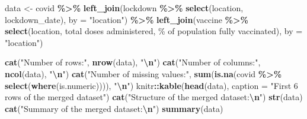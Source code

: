 \documentclass[
]{article}
\newenvironment{Shaded}{\begin{snugshade}}{\end{snugshade}}
\newcommand{\AttributeTok}[1]{\textcolor[rgb]{0.13,0.29,0.53}{#1}}
\newcommand{\FunctionTok}[1]{\textcolor[rgb]{0.13,0.29,0.53}{\textbf{#1}}}
\newcommand{\NormalTok}[1]{#1}
\newcommand{\OtherTok}[1]{\textcolor[rgb]{0.56,0.35,0.01}{#1}}
\newcommand{\SpecialCharTok}[1]{\textcolor[rgb]{0.81,0.36,0.00}{\textbf{#1}}}
\newcommand{\StringTok}[1]{\textcolor[rgb]{0.31,0.60,0.02}{#1}}
\begin{document}
\begin{Shaded}
\begin{Highlighting}[]
\NormalTok{data }\OtherTok{\textless{}{-}}\NormalTok{ covid }\SpecialCharTok{\%\textgreater{}\%}
  \FunctionTok{left\_join}\NormalTok{(lockdown }\SpecialCharTok{\%\textgreater{}\%} \FunctionTok{select}\NormalTok{(location, lockdown\_date), }\AttributeTok{by =} \StringTok{"location"}\NormalTok{) }\SpecialCharTok{\%\textgreater{}\%}
  \FunctionTok{left\_join}\NormalTok{(vaccine }\SpecialCharTok{\%\textgreater{}\%} \FunctionTok{select}\NormalTok{(location, }\StringTok{\textasciigrave{}}\AttributeTok{total doses administered}\StringTok{\textasciigrave{}}\NormalTok{, }\StringTok{\textasciigrave{}}\AttributeTok{\% of population fully vaccinated}\StringTok{\textasciigrave{}}\NormalTok{), }\AttributeTok{by =} \StringTok{"location"}\NormalTok{)}
\end{Highlighting}
\end{Shaded}

\vspace{1cm}

\begin{Shaded}
\begin{Highlighting}[]
\FunctionTok{cat}\NormalTok{(}\StringTok{"Number of rows:"}\NormalTok{, }\FunctionTok{nrow}\NormalTok{(data), }\StringTok{"}\SpecialCharTok{\textbackslash{}n}\StringTok{"}\NormalTok{)}
\FunctionTok{cat}\NormalTok{(}\StringTok{"Number of columns:"}\NormalTok{, }\FunctionTok{ncol}\NormalTok{(data), }\StringTok{"}\SpecialCharTok{\textbackslash{}n}\StringTok{"}\NormalTok{)}
\FunctionTok{cat}\NormalTok{(}\StringTok{"Number of missing values:"}\NormalTok{, }\FunctionTok{sum}\NormalTok{(}\FunctionTok{is.na}\NormalTok{(covid }\SpecialCharTok{\%\textgreater{}\%} \FunctionTok{select}\NormalTok{(}\FunctionTok{where}\NormalTok{(is.numeric)))), }\StringTok{"}\SpecialCharTok{\textbackslash{}n}\StringTok{"}\NormalTok{)}
\NormalTok{knitr}\SpecialCharTok{::}\FunctionTok{kable}\NormalTok{(}\FunctionTok{head}\NormalTok{(data), }\AttributeTok{caption =} \StringTok{"First 6 rows of the merged dataset"}\NormalTok{)}
\FunctionTok{cat}\NormalTok{(}\StringTok{"Structure of the merged dataset:}\SpecialCharTok{\textbackslash{}n}\StringTok{"}\NormalTok{)}
\FunctionTok{str}\NormalTok{(data)}
\FunctionTok{cat}\NormalTok{(}\StringTok{"Summary of the merged dataset:}\SpecialCharTok{\textbackslash{}n}\StringTok{"}\NormalTok{)}
\FunctionTok{summary}\NormalTok{(data)}
\end{Highlighting}
\end{Shaded}
\end{document}
